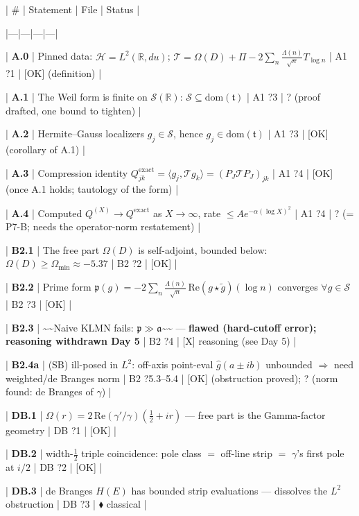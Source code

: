\documentclass[10pt]{article}
\begin{document}
| \# | Statement | File | Status |\par
|---|---|---|---|\par
| \textbf{A.0} | Pinned data: $\mathcal H=L^2(\mathbb R,du)$; $\mathcal T=\Omega(D)+\Pi-2\sum_n\tfrac{\Lambda(n)}{\sqrt n}T_{\log n}$ | A1 ?1 | [OK] (definition) |\par
| \textbf{A.1} | The Weil form is finite on $\mathcal S(\mathbb R)$: $\mathcal S\subseteq\mathrm{dom}(\mathfrak t)$ | A1 ?3 | ? (proof drafted, one bound to tighten) |\par
| \textbf{A.2} | Hermite--Gauss localizers $g_j\in\mathcal S$, hence $g_j\in\mathrm{dom}(\mathfrak t)$ | A1 ?3 | [OK] (corollary of A.1) |\par
| \textbf{A.3} | Compression identity $Q^{\mathrm{exact}}_{jk}=\langle g_j,\mathcal T g_k\rangle=(P_J\mathcal T P_J)_{jk}$ | A1 ?4 | [OK] (once A.1 holds; tautology of the form) |\par
| \textbf{A.4} | Computed $Q^{(X)}\to Q^{\mathrm{exact}}$ as $X\to\infty$, rate $\le A e^{-\alpha(\log X)^2}$ | A1 ?4 | ? (= P7-B; needs the operator-norm restatement) |\par
| \textbf{B2.1} | The free part $\Omega(D)$ is self-adjoint, bounded below: $\Omega(D)\ge\Omega_{\min}\approx-5.37$ | B2 ?2 | [OK] |\par
| \textbf{B2.2} | Prime form $\mathfrak p(g)=-2\sum_n\tfrac{\Lambda(n)}{\sqrt n}\,\mathrm{Re}(g\star\tilde g)(\log n)$ converges $\forall g\in\mathcal S$ | B2 ?3 | [OK] |\par
| \textbf{B2.3} | \textasciitilde{}\textasciitilde{}Naive KLMN fails: $\mathfrak p\gg\mathfrak a$\textasciitilde{}\textasciitilde{} --- \textbf{flawed (hard-cutoff error); reasoning withdrawn Day 5} | B2 ?4 | [X] reasoning (see Day 5) |\par
| \textbf{B2.4a} | (SB) ill-posed in $L^2$: off-axis point-eval $\widehat g(a\pm ib)$ unbounded \ensuremath{\Rightarrow} need weighted/de Branges norm | B2 ?5.3--5.4 | [OK] (obstruction proved); ? (norm found: de Branges of $\gamma$) |\par
| \textbf{DB.1} | $\Omega(r)=2\,\mathrm{Re}(\gamma'/\gamma)(\tfrac12+ir)$ --- free part is the Gamma-factor geometry | DB ?1 | [OK] |\par
| \textbf{DB.2} | width-$\tfrac12$ triple coincidence: pole class $=$ off-line strip $=$ $\gamma$'s first pole at $i/2$ | DB ?2 | [OK] |\par
| \textbf{DB.3} | de Branges $H(E)$ has bounded strip evaluations --- dissolves the $L^2$ obstruction | DB ?3 | $\blacklozenge$ classical |\par
\end{document}

